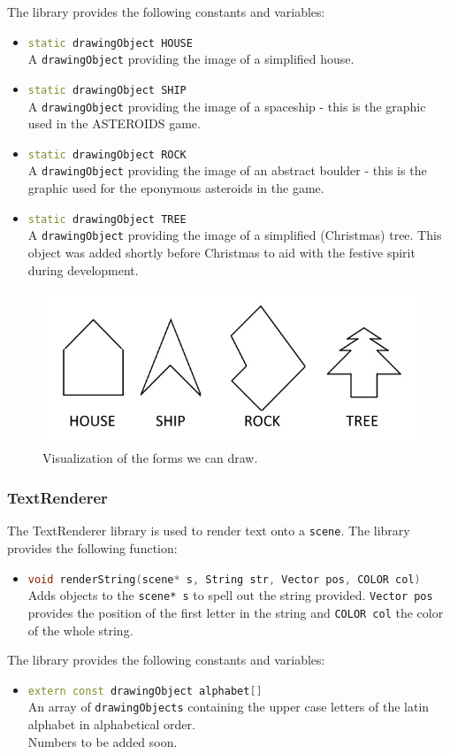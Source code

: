 \documentclass{report}
\begin{document}
The library provides the following constants and variables:
\begin{itemize}
	\item \lstinline[language=c++]{static drawingObject HOUSE} \\
		A \lstinline{drawingObject} providing the image of a simplified house.
	\item \lstinline[language=c++]{static drawingObject SHIP} \\
		A \lstinline{drawingObject} providing the image of a spaceship - this is the graphic used in the ASTEROIDS game.
	\item \lstinline[language=c++]{static drawingObject ROCK} \\
		A \lstinline{drawingObject} providing the image of an abstract boulder - this is the graphic used for the eponymous asteroids in the game.
	\item \lstinline[language=c++]{static drawingObject TREE} \\
		A \lstinline{drawingObject} providing the image of a simplified (Christmas) tree. This object was added shortly before Christmas to aid with the festive spirit during development.
\end{itemize}
\begin{figure}[h]
	\centering
	\includegraphics[width=\textwidth]{forms.jpg}
	\caption{Visualization of the forms we can draw.}
	\label{img:forms}
\end{figure}
\subsubsection{TextRenderer}
The TextRenderer library is used to render text onto a \lstinline{scene}.
The library provides the following function:
\begin{itemize}
	\item \lstinline[language=c++]{void renderString(scene* s, String str, Vector pos, COLOR col)} \\
		Adds objects to the \lstinline{scene* s} to spell out the string provided. \lstinline{Vector pos} provides the position of the first letter in the string and \lstinline{COLOR col} the color of the whole string.
\end{itemize}
The library provides the following constants and variables:
\begin{itemize}
	\item \lstinline[language=c++]{extern const drawingObject alphabet[]} \\
		An array of \lstinline{drawingObjects} containing the upper case letters of the latin alphabet in alphabetical order.\\
		Numbers to be added soon.
\end{itemize}
\end{document}
